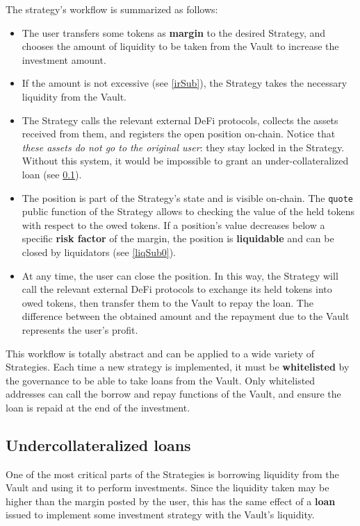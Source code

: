 \documentclass[a4paper,10 pt]{article}
\theoremstyle{definition}
\begin{document}
The strategy's workflow is summarized as follows:
\begin{itemize}
\item The user transfers some tokens as {\bf margin} to the desired Strategy, and chooses the amount of liquidity to be taken from the Vault to increase the investment amount.
\item If the amount is not excessive (see \ref{irSub}), the Strategy takes the necessary liquidity from the Vault.
\item The Strategy calls the relevant external DeFi protocols, collects the assets received from them, and registers the open position on-chain. Notice that {\it these assets do not go to the original user}: they stay locked in the Strategy. Without this system, it would be impossible to grant an under-collateralized loan (see \ref{ulSub}).
\item The position is part of the Strategy's state and is visible on-chain. The \verb|quote| public function of the Strategy allows to checking the value of the held tokens with respect to the owed tokens. If a position's value decreases below a specific {\bf risk factor} of the margin, the position is {\bf liquidable} and can be closed by liquidators (see \ref{liqSub0}).
\item At any time, the user can close the position. In this way, the Strategy will call the relevant external DeFi protocols to exchange its held tokens into owed tokens, then transfer them to the Vault to repay the loan. The difference between the obtained amount and the repayment due to the Vault represents the user's profit.
\end{itemize} 

This workflow is totally abstract and can be applied to a wide variety of Strategies. Each time a new strategy is implemented, it must be {\bf whitelisted} by the governance to be able to take loans from the Vault.
Only whitelisted addresses can call the borrow and repay functions of the Vault, and ensure the loan is repaid at the end of the investment.

\subsection{Undercollateralized loans}\label{ulSub}

One of the most critical parts of the Strategies is borrowing liquidity from the Vault and using it to perform investments. Since the liquidity taken may be higher than the margin posted by the user, this has the same effect of a {\bf loan} issued to implement some investment strategy with the Vault's liquidity.
\end{document}
